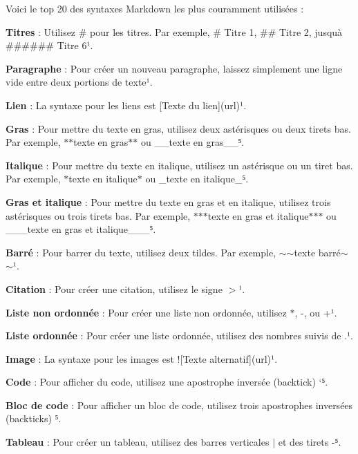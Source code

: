 Voici le top 20 des syntaxes Markdown les plus couramment utilisées \+:

{\bfseries Titres} \+: Utilisez {\ttfamily \#} pour les titres. Par exemple, {\ttfamily \# Titre 1}, {\ttfamily \#\# Titre 2}, jusqu\textquotesingle{}à {\ttfamily \#\#\#\#\#\# Titre 6}¹.

{\bfseries Paragraphe} \+: Pour créer un nouveau paragraphe, laissez simplement une ligne vide entre deux portions de texte¹.

{\bfseries Lien} \+: La syntaxe pour les liens est {\ttfamily \mbox{[}Texte du lien\mbox{]}(url)}¹.

{\bfseries Gras} \+: Pour mettre du texte en gras, utilisez deux astérisques ou deux tirets bas. Par exemple, {\ttfamily $\ast$$\ast$texte en gras$\ast$$\ast$} ou {\ttfamily \+\_\+\+\_\+texte en gras\+\_\+\+\_\+}⁵.

{\bfseries Italique} \+: Pour mettre du texte en italique, utilisez un astérisque ou un tiret bas. Par exemple, {\ttfamily $\ast$texte en italique$\ast$} ou {\ttfamily \+\_\+texte en italique\+\_\+}⁵.

{\bfseries Gras et italique} \+: Pour mettre du texte en gras et en italique, utilisez trois astérisques ou trois tirets bas. Par exemple, {\ttfamily $\ast$$\ast$$\ast$texte en gras et italique$\ast$$\ast$$\ast$} ou {\ttfamily \+\_\+\+\_\+\+\_\+texte en gras et italique\+\_\+\+\_\+\+\_\+}⁵.

{\bfseries Barré} \+: Pour barrer du texte, utilisez deux tildes. Par exemple, {\ttfamily $\sim$$\sim$texte barré$\sim$$\sim$}¹.

{\bfseries Citation} \+: Pour créer une citation, utilisez le signe {\ttfamily $>$}¹.

{\bfseries Liste non ordonnée} \+: Pour créer une liste non ordonnée, utilisez {\ttfamily $\ast$}, {\ttfamily -\/}, ou {\ttfamily +}¹.

{\bfseries Liste ordonnée} \+: Pour créer une liste ordonnée, utilisez des nombres suivis de {\ttfamily .}¹.

{\bfseries Image} \+: La syntaxe pour les images est {\ttfamily !\mbox{[}Texte alternatif\mbox{]}(url)}¹.

{\bfseries Code} \+: Pour afficher du code, utilisez une apostrophe inversée (backtick) `⁵.

{\bfseries Bloc de code} \+: Pour afficher un bloc de code, utilisez trois apostrophes inversées (backticks) ⁵.

{\bfseries Tableau} \+: Pour créer un tableau, utilisez des barres verticales {\ttfamily $\vert$} et des tirets {\ttfamily -\/}⁵.


